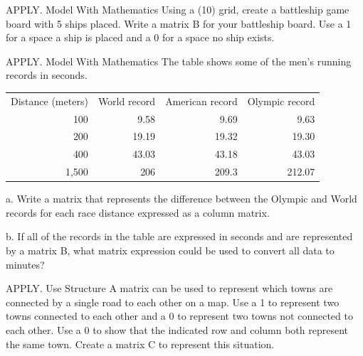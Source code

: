 \documentclass{article}
\newenvironment{practice}[2]{}{}        %
\newcommand{\answer}[1]{}               %
\newcommand{\placeholder}[2]{}          %
\newcommand{\te}[1]{}                   %
\begin{document}
\te{STEP 3 Practice \& Problem Solving. Practice \& Problem Solving is available at SavvasRealize.com. Practice.}
\begin{practice}{31}{2}
APPLY. Model With Mathematics Using a (10) grid, create a battleship game board with 5 ships placed. Write a matrix B for your battleship board. Use a 1 for a space a ship is placed and a 0 for a space no ship exists.
\answer{Check students' work.}
\end{practice}
\begin{practice}{32}{2}
APPLY. Model With Mathematics The table shows some of the men's running records in seconds.
\begin{tabular}{rrrr}
Distance (meters) & World record & American record & Olympic record \\
100 & 9.58 & 9.69 & 9.63 \\
200 & 19.19 & 19.32 & 19.30 \\
400 & 43.03 & 43.18 & 43.03 \\
1,500 & 206 & 209.3 & 212.07 \\
\end{tabular}
a. Write a matrix that represents the difference between the Olympic and World records for each race distance expressed as a column matrix.
\answer{(\begin{bmatrix}0.05\\0.11\\0\\6.07\end{bmatrix})}
b. If all of the records in the table are expressed in seconds and are represented by a matrix B, what matrix expression could be used to convert all data to minutes?
\answer{(\frac1{60}B)}
\end{practice}
\begin{practice}{33}{2}
APPLY. Use Structure A matrix can be used to represent which towns are connected by a single road to each other on a map. Use a 1 to represent two towns connected to each other and a 0 to represent two towns not connected to each other. Use a 0 to show that the indicated row and column both represent the same town. Create a matrix C to represent this situation.
\placeholder{map}{Stylized map with white roads, yellow and green land blocks, blue river and water at lower right. Five red town dots labeled Loveland (upper center), Norwood (left just below Loveland), Mariemont (right middle), Pleasant Ridge (lower left), Oakley (lower center-right). One north-south road connects Norwood and Pleasant Ridge; roads connect Loveland to Mariemont and Oakley; Norwood to Oakley; Pleasant Ridge to Oakley. River curves from upper right toward lower left.}
\answer{(C=\begin{bmatrix}0&1&0&1&0\\1&0&0&0&0\\0&0&0&1&1\\1&0&1&0&1\\0&0&1&1&0\end{bmatrix})}
\end{practice}
\end{document}
